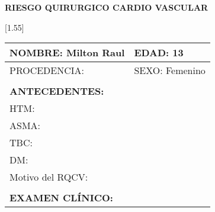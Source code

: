 \documentclass[10pt,a4paper]{article}
\begin{document}
 
\begin{center}
\begin{large}
\textbf{RIESGO QUIRURGICO CARDIO VASCULAR}
\end{large}
\scalebox{1.40}[1.55]{
\begin{tabular}{|p{2.8cm}p{2.8cm}p{2.8cm}p{2.8cm}|} 
\hline 

\multicolumn{2}{|l}{\begin{minipage}[t]{5.5 cm}\scriptsize{NOMBRE: Milton Raul}\end{minipage}}&\multicolumn{2}{l|}{\begin{minipage}[t]{5.5 cm}\scriptsize{EDAD: 13}\end{minipage}}\\
\hline
\multicolumn{2}{|l}{\begin{minipage}[t]{5.5 cm}\scriptsize{PROCEDENCIA: }\end{minipage}}&\multicolumn{2}{l|}{\begin{minipage}[t]{5.5 cm}\scriptsize{SEXO: Femenino}\end{minipage}}\\
\hline
\multicolumn{1}{l}{\scriptsize{}}&&& \multicolumn{1}{l}{ \scriptsize{}}\\
\multicolumn{1}{l}{\scriptsize{\textbf{ANTECEDENTES:}}}&&& \multicolumn{1}{l}{ \scriptsize{}}\\
\hline 
\multicolumn{4}{|l|}{\begin{minipage}[t]{12.5 cm}\scriptsize{HTM: }\end{minipage}}\\
\hline
\multicolumn{4}{|l|}{\begin{minipage}[t]{12.5 cm}\scriptsize{ASMA: }\end{minipage}}\\
\hline
\multicolumn{4}{|l|}{\begin{minipage}[t]{12.5 cm}\scriptsize{TBC: }\end{minipage}}\\
\hline
\multicolumn{4}{|l|}{\begin{minipage}[t]{12.5 cm}\scriptsize{DM: }\end{minipage}}\\
\hline
\multicolumn{4}{|l|}{\begin{minipage}[t]{12.5 cm}\scriptsize{Motivo del RQCV: }\end{minipage}}\\
\hline
\multicolumn{1}{l}{\scriptsize{}}&&& \multicolumn{1}{l}{ \scriptsize{}}\\
\multicolumn{1}{l}{\scriptsize{\textbf{EXAMEN CL\'INICO: }}}&&& \multicolumn{1}{l}{ \scriptsize{}}\\

\end{tabular}}
\end{center}
\end{document}
